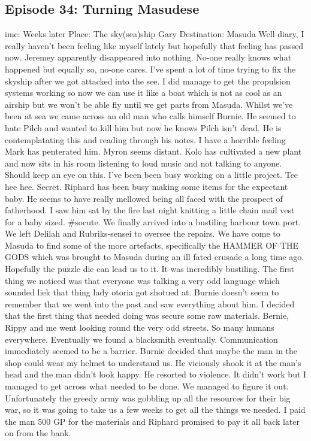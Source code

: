 \subsection{Episode 34: Turning Masudese}\medskip
{}ime: Weeks later\medskip
Place: The sky(sea)ship Gary\medskip
Destination: Masuda\medskip
Well diary, I really haven’t been feeling like myself lately but hopefully that feeling has passed now. Jeremey apparently disappeared into nothing. No-one really knows what happened but equally so, no-one cares.\medskip
I’ve spent a lot of time trying to fix the skyship after we got attacked into the see. I did manage to get the propulsion systems working so now we can use it like a boat which is not as cool as an airship but we won’t be able fly until we get parts from Masuda. Whilst we’ve been at sea we came across an old man who calls himself Burnie. He seemed to hate Pilch and wanted to kill him but now he knows Pilch isn’t dead. He is contemplatating this and reading through his notes. I have a horrible feeling Mark has penterated him.\medskip
Myron seems distant.\medskip
Kolo has cultivated a new plant and now sits in his room listening to loud music and not talking to anyone. Should keep an eye on this.\medskip
I’ve been been busy working on a little project. Tee hee hee. Secret.\medskip
Riphard has been busy making some items for the expectant baby. He seems to have really mellowed being all faced with the prospect of fatherhood. I saw him sat by the fire last night knitting a little chain mail vest for a baby sized. \#socute.\medskip
We finally arrived into a bustiling harbour town port. We left Delilah and Rubriks-sensei to oversee the repairs. We have come to Masuda to find some of the more artefacts, specifically the HAMMER OF THE GODS which was brought to Masuda during an ill fated crusade a long time ago. Hopefully the puzzle die can lead us to it. It was incredibly bustiling. The first thing we noticed was that everyone was talking a very odd language which sounded liek that thing lady otoria got shotued at. Burnie doesn’t seem to remember that we went into the past and saw everything about him. I decided that the first thing that needed doing was secure some raw materials. Bernie, Rippy and me went looking round the very odd streets. So many humans everywhere. Eventually we found a blacksmith eventually. Communication immediately seemed to be a barrier. Burnie decided that maybe the man in the shop could wear my helmet to understand us. He viciously shook it at the man’s head and the man didn’t look happy. He resorted to violence. It didn’t work but I managed to get across what needed to be done. We managed to figure it out. Unfortunately the greedy army was gobbling up all the resources for their big war, so it was going to take us a few weeks to get all the things we needed. I paid the man 500 GP for the materials and Riphard promised to pay it all back later on from the bank.\medskip
